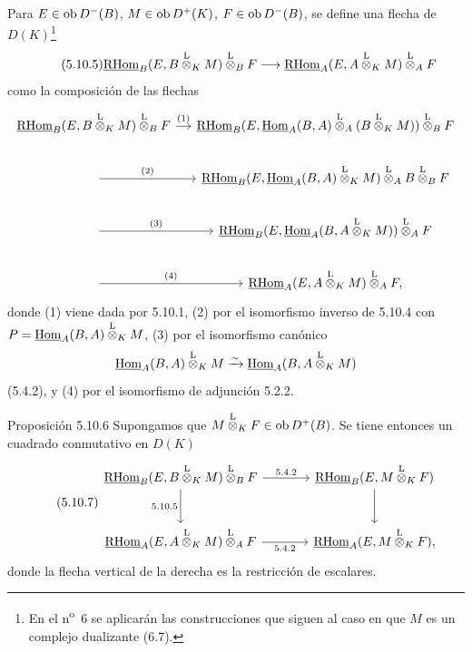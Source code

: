 Para $E\in\operatorname{ob} D^-(B)$, $M\in\operatorname{ob} D^+(K)$, $F\in\operatorname{ob} D^-(B)$, se define una flecha de $D(K)$\footnote{En el n\textsuperscript{o}~6 se aplicarán las construcciones que siguen al caso en que $M$ es un complejo dualizante (6.7).}
\begin{equation}\tag{5.10.5}
\underline{\mathrm{RHom}}_B(E,B\overset{\mathrm L}{\otimes}_KM)\overset{\mathrm L}{\otimes}_BF\longrightarrow\underline{\mathrm{RHom}}_A(E,A\overset{\mathrm L}{\otimes}_KM)\overset{\mathrm L}{\otimes}_AF
\end{equation}
como la composición de las flechas
\[
\begin{tikzcd}[column sep=small]
\uRHom_B(E,B\lten_KM)\lten_BF \arrow[r,"(1)"] & \uRHom_B(E,\uHom_A(B,A)\lten_A(B\lten_KM))\lten_BF \\
\arrow[r,"(2)"] & \uRHom_B(E,\uHom_A(B,A)\lten_KM)\lten_A B\lten_BF \\
\arrow[r,"(3)"] & \uRHom_B(E,\uHom_A(B,A\lten_KM))\lten_AF \\
\arrow[r,"(4)"] & \uRHom_A(E,A\lten_KM)\lten_AF,
\end{tikzcd}
\]
donde (1) viene dada por 5.10.1, (2) por el isomorfismo inverso de 5.10.4 con $P=\underline{\operatorname{Hom}}_A(B,A)\overset{\mathrm L}{\otimes}_KM$, (3) por el isomorfismo canónico
\[
\underline{\operatorname{Hom}}_A(B,A)\overset{\mathrm L}{\otimes}_KM\xrightarrow{\sim}\underline{\operatorname{Hom}}_A(B,A\overset{\mathrm L}{\otimes}_KM)
\]
(5.4.2), y (4) por el isomorfismo de adjunción 5.2.2.

\begin{statement}{Proposición 5.10.6}
Supongamos que $M\overset{\mathrm L}{\otimes}_KF\in\operatorname{ob} D^+(B)$. Se tiene entonces un cuadrado conmutativo en $D(K)$
\begin{equation}\tag{5.10.7}
\begin{tikzcd}[column sep=large,row sep=large]
\uRHom_B(E,B\lten_KM)\lten_BF \arrow[r,"5.4.2"] \arrow[d,"5.10.5"'] & \uRHom_B(E,M\lten_KF) \arrow[d]\\
\uRHom_A(E,A\lten_KM)\lten_AF \arrow[r,"5.4.2"'] & \uRHom_A(E,M\lten_KF),
\end{tikzcd}
\end{equation}
donde la flecha vertical de la derecha es la restricción de escalares.
\end{statement}
